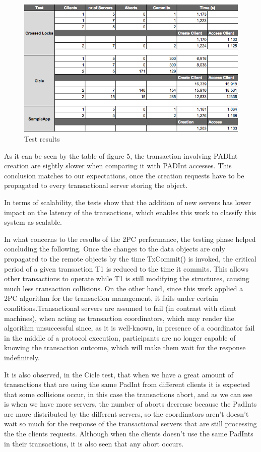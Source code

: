 \documentclass[times, 10pt,twocolumn]{article}
\begin{document}
\begin{figure}[h!]
	\centering
	\includegraphics[scale=0.4]{Tabela.png}
	\caption{Test results}
\end{figure}


As it can be seen by the table of figure 5, the transaction involving PADInt creation are sightly slower when comparing it with PADInt accesses. This conclusion matches to our expectations,
once the creation requests have to be propagated to every transactional server storing the object.

In terms of scalability, the tests show that the addition of new servers has lower impact on the latency of the transactions, which enables this work to classify this system as scalable.

In what concerns to the results of the 2PC performance, the testing phase helped concluding the following. Once the changes to the data objects are only propagated to the remote objects by the time TxCommit() is invoked, the critical period of a given transaction T1 is reduced to the time it commits. This allows other transactions to operate while T1 is still modifying the structures, causing much less transaction collisions. On the other hand, since this work applied a 2PC algorithm for the transaction management, it fails under certain conditions.Transactional servers are assumed to fail (in contrast with client machines), when acting as transaction coordinators, which may render the algorithm unsuccessful since, as it is well-known, in presence of a coordinator fail in the middle of a protocol execution, participants are no longer capable of knowing the transaction outcome, which will make them wait for the response indefinitely. 

It is also observed, in the Cicle test, that when we have a great amount of transactions that are using the same PadInt from different clients it is expected that some collisions occur, in this case the transactions abort, and as we can see is when we have more servers, the number of aborts decrease because the PadInts are more distributed by the different servers, so the coordinators aren't doesn't wait so much for the response of the transactional servers that are still processing the the clients requests. Although when the clients doesn't use the same PadInts in their transactions, it is also seen that any abort occurs. 
\end{document}
